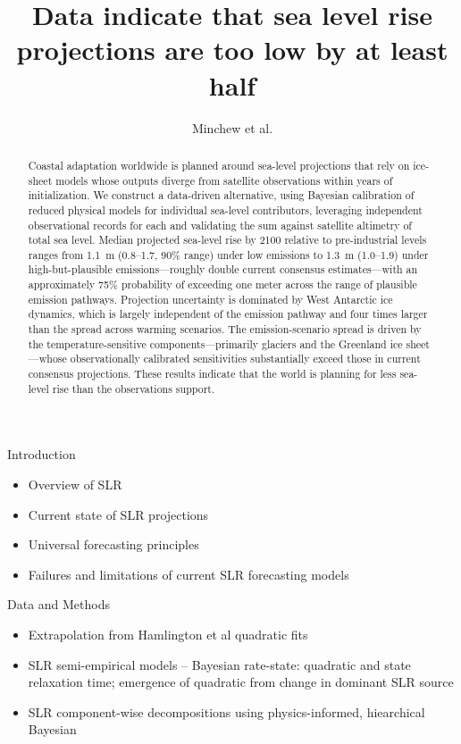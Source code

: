 \documentclass[11pt]{article}
\title{Data indicate that sea level rise projections are too low by at least half}
\author{Minchew et al.}
\date{}
\begin{document}
\maketitle

\begin{abstract}
Coastal adaptation worldwide is planned around sea-level projections that rely on ice-sheet models whose outputs diverge from satellite observations within years of initialization. We construct a data-driven alternative, using Bayesian calibration of reduced physical models for individual sea-level contributors, leveraging independent observational records for each and validating the sum against satellite altimetry of total sea level. Median projected sea-level rise by 2100 relative to pre-industrial levels ranges from 1.1~m (0.8--1.7, 90\% range) under low emissions to 1.3~m (1.0--1.9) under high-but-plausible emissions---roughly double current consensus estimates---with an approximately 75\% probability of exceeding one meter across the range of plausible emission pathways. Projection uncertainty is dominated by West Antarctic ice dynamics, which is largely independent of the emission pathway and four times larger than the spread across warming scenarios. The emission-scenario spread is driven by the temperature-sensitive components---primarily glaciers and the Greenland ice sheet---whose observationally calibrated sensitivities substantially exceed those in current consensus projections. These results indicate that the world is planning for less sea-level rise than the observations support.
\end{abstract}

\item{Introduction}
\begin{itemize}
	\item Overview of SLR 
	\item Current state of SLR projections
	\item Universal forecasting principles 
	\item Failures and limitations of current SLR forecasting models 
\end{itemize}

\item{Data and Methods}
\begin{itemize}
	\item Extrapolation from Hamlington et al quadratic fits 
	\item SLR semi-empirical models -- Bayesian rate-state: quadratic and state relaxation time; emergence of quadratic from change in dominant SLR source 
	\item SLR component-wise decompositions using physics-informed, hiearchical Bayesian 
\end{itemize}
\end{document}
